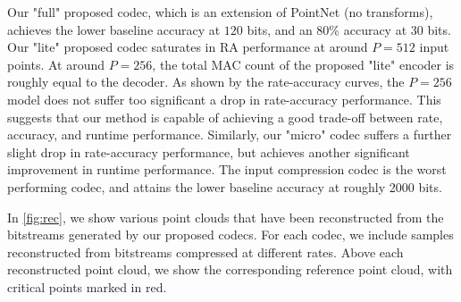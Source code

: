 
Our "full" proposed codec, which is an extension of PointNet (no transforms), achieves the lower baseline accuracy at $120$ bits, and an 80\% accuracy at $30$ bits.
Our "lite" proposed codec saturates in RA performance at around $P=512$ input points.
At around $P=256$, the total MAC count of the proposed "lite" encoder is roughly equal to the decoder.
As shown by the rate-accuracy curves, the $P=256$ model does not suffer too significant a drop in rate-accuracy performance.
This suggests that our method is capable of achieving a good trade-off between rate, accuracy, and runtime performance.
Similarly, our "micro" codec suffers a further slight drop in rate-accuracy performance, but achieves another significant improvement in runtime performance.
The input compression codec is the worst performing codec, and attains the lower baseline accuracy at roughly 2000 bits.

In \cref{fig:rec}, we show various point clouds that have been reconstructed from the bitstreams generated by our proposed codecs.
For each codec, we include samples reconstructed from bitstreams compressed at different rates.
Above each reconstructed point cloud, we show the corresponding reference point cloud, with critical points marked in red.


